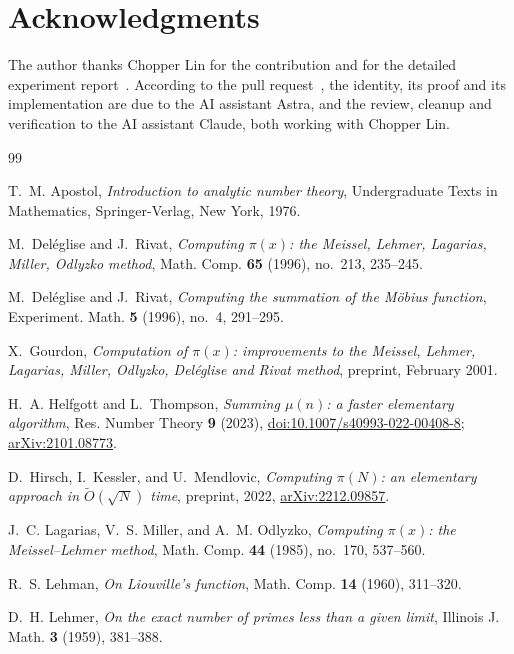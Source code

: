 \documentclass[11pt,a4paper]{amsart}
\numberwithin{equation}{section}
\begin{document}
\section*{Acknowledgments}
The author thanks Chopper Lin for the contribution and for the detailed
experiment report~\cite{Lin2026}. According to the pull request~\cite{PR146},
the identity, its proof and its implementation are due to the AI assistant
Astra, and the review, cleanup and verification to the AI assistant Claude,
both working with Chopper Lin.

\begin{thebibliography}{99}

T.~M. Apostol, \emph{Introduction to analytic number theory}, Undergraduate
Texts in Mathematics, Springer-Verlag, New York, 1976.

M.~Del\'eglise and J.~Rivat, \emph{Computing $\pi(x)$: the Meissel, Lehmer,
Lagarias, Miller, Odlyzko method}, Math. Comp. \textbf{65} (1996), no.~213,
235--245.

M.~Del\'eglise and J.~Rivat, \emph{Computing the summation of the M\"obius
function}, Experiment. Math. \textbf{5} (1996), no.~4, 291--295.

X.~Gourdon, \emph{Computation of $\pi(x)$: improvements to the Meissel, Lehmer,
Lagarias, Miller, Odlyzko, Del\'eglise and Rivat method}, preprint, February
2001.

H.~A. Helfgott and L.~Thompson, \emph{Summing $\mu(n)$: a faster elementary
algorithm}, Res. Number Theory \textbf{9} (2023),
\href{https://doi.org/10.1007/s40993-022-00408-8}{doi:10.1007/s40993-022-00408-8};
\href{https://arxiv.org/abs/2101.08773}{arXiv:2101.08773}.

D.~Hirsch, I.~Kessler, and U.~Mendlovic, \emph{Computing $\pi(N)$: an
elementary approach in $\tilde O(\sqrt N)$ time}, preprint, 2022,
\href{https://arxiv.org/abs/2212.09857}{arXiv:2212.09857}.

J.~C. Lagarias, V.~S. Miller, and A.~M. Odlyzko, \emph{Computing $\pi(x)$: the
Meissel--Lehmer method}, Math. Comp. \textbf{44} (1985), no.~170, 537--560.

R.~S. Lehman, \emph{On Liouville's function}, Math. Comp. \textbf{14} (1960),
311--320.

D.~H. Lehmer, \emph{On the exact number of primes less than a given limit},
Illinois J. Math. \textbf{3} (1959), 381--388.


\end{thebibliography}
\end{document}
